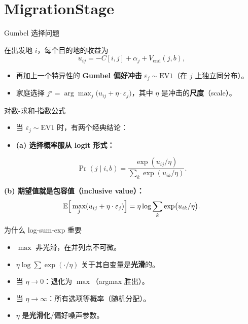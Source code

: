 \documentclass[10pt,aspectratio=169]{beamer}
\begin{document}
\section[MigrationStage]{MigrationStage}

\begin{frame}{Gumbel 选择问题}

在出发地 $i$，每个目的地的收益为
\[
u_{ij} = -C[i, j] + \alpha_j + V_{\text{end}}(j, b),
\]

\begin{itemize}
  \item 再加上一个特异性的 \textbf{Gumbel 偏好冲击} $\varepsilon_j \sim \text{EV1}$（在 $j$ 上独立同分布）。
  \item 家庭选择 $j^\star = \arg\max_j \big( u_{ij} + \eta \cdot \varepsilon_j \big)$，其中 $\eta$ 是冲击的\textbf{尺度}（scale）。
\end{itemize}

\end{frame}

\begin{frame}{对数-求和-指数公式}

\begin{itemize}
  \item 当 $\varepsilon_j \sim \text{EV1}$ 时，有两个经典结论：
  \item \textbf{(a) 选择概率服从 logit 形式：}
\end{itemize}

\[
\Pr(j \mid i, b) = \frac{\exp(u_{ij} / \eta)}{\sum_k \exp(u_{ik} / \eta)}.
\]

\textbf{(b) 期望值就是包容值（inclusive value）：}
\[
\mathbb{E}\Big[\max_j (u_{ij} + \eta \cdot \varepsilon_j)\Big] = \eta \log \sum_k \exp\!\big(u_{ik} / \eta \big).
\]

\end{frame}

\begin{frame}{为什么 log-sum-exp 重要}

\begin{itemize}
  \item $\max$ 非光滑，在并列点不可微。
  \item $\eta \log \sum \exp(\cdot / \eta)$ 关于其自变量是\textbf{光滑}的。
  \item 当 $\eta \to 0$：退化为 $\max$（argmax 胜出）。
  \item 当 $\eta \to \infty$：所有选项等概率（随机分配）。
  \item $\eta$ 是\textbf{光滑化}/偏好噪声参数。
\end{itemize}

\end{frame}
\end{document}
